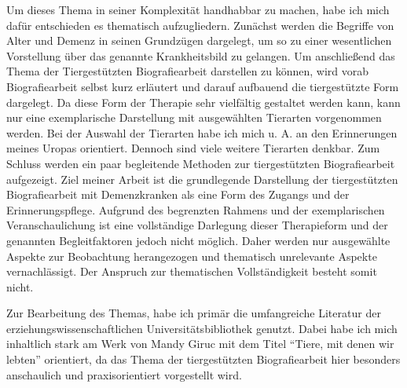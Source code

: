 Um dieses Thema in seiner Komplexität handhabbar zu machen, habe ich mich dafür entschieden es thematisch aufzugliedern. Zunächst werden die Begriffe von Alter und Demenz in seinen Grundzügen dargelegt, um so zu einer wesentlichen Vorstellung über das genannte Krankheitsbild zu gelangen. Um anschließend das Thema der Tiergestützten Biografiearbeit darstellen zu können, wird vorab Biografiearbeit selbst kurz erläutert und darauf aufbauend die tiergestützte Form dargelegt. Da diese Form der Therapie sehr vielfältig gestaltet werden kann, kann nur eine exemplarische Darstellung mit ausgewählten Tierarten vorgenommen werden. Bei der Auswahl der Tierarten habe ich mich u. A. an den Erinnerungen meines Uropas orientiert. Dennoch sind viele weitere Tierarten denkbar. Zum Schluss werden ein paar begleitende Methoden zur tiergestützten Biografiearbeit aufgezeigt.
Ziel meiner Arbeit ist die grundlegende Darstellung der tiergestützten Biografiearbeit mit Demenzkranken als eine Form des Zugangs und der Erinnerungspflege. Aufgrund des begrenzten Rahmens und der exemplarischen Veranschaulichung ist eine vollständige Darlegung dieser Therapieform und der genannten Begleitfaktoren jedoch nicht möglich. Daher werden nur ausgewählte Aspekte zur Beobachtung herangezogen und thematisch unrelevante Aspekte vernachlässigt. Der Anspruch zur thematischen Vollständigkeit besteht somit nicht.

Zur Bearbeitung des Themas, habe ich primär die umfangreiche Literatur der erziehungswissenschaftlichen Universitätsbibliothek genutzt. Dabei habe ich mich inhaltlich stark am Werk von Mandy Giruc mit dem Titel "`Tiere, mit denen wir lebten"' orientiert, da  das Thema der tiergestützten Biografiearbeit hier besonders anschaulich und praxisorientiert vorgestellt wird. 
